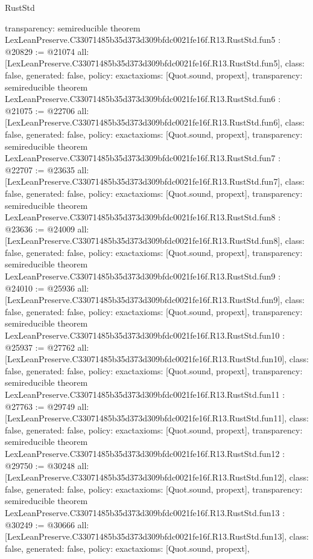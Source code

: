 \begin{lexlean}{RustStd}
\begin{coremodule}
{  transparency: semireducible
}
theorem LexLeanPreserve.C33071485b35d373d309bfdc0021fe16f.R13.RustStd.fun5 : @20829 := @21074 {
  all: [LexLeanPreserve.C33071485b35d373d309bfdc0021fe16f.R13.RustStd.fun5],
  class: false,
  generated: false,
  policy: exact{axioms: [Quot.sound, propext]},
  transparency: semireducible
}
theorem LexLeanPreserve.C33071485b35d373d309bfdc0021fe16f.R13.RustStd.fun6 : @21075 := @22706 {
  all: [LexLeanPreserve.C33071485b35d373d309bfdc0021fe16f.R13.RustStd.fun6],
  class: false,
  generated: false,
  policy: exact{axioms: [Quot.sound, propext]},
  transparency: semireducible
}
theorem LexLeanPreserve.C33071485b35d373d309bfdc0021fe16f.R13.RustStd.fun7 : @22707 := @23635 {
  all: [LexLeanPreserve.C33071485b35d373d309bfdc0021fe16f.R13.RustStd.fun7],
  class: false,
  generated: false,
  policy: exact{axioms: [Quot.sound, propext]},
  transparency: semireducible
}
theorem LexLeanPreserve.C33071485b35d373d309bfdc0021fe16f.R13.RustStd.fun8 : @23636 := @24009 {
  all: [LexLeanPreserve.C33071485b35d373d309bfdc0021fe16f.R13.RustStd.fun8],
  class: false,
  generated: false,
  policy: exact{axioms: [Quot.sound, propext]},
  transparency: semireducible
}
theorem LexLeanPreserve.C33071485b35d373d309bfdc0021fe16f.R13.RustStd.fun9 : @24010 := @25936 {
  all: [LexLeanPreserve.C33071485b35d373d309bfdc0021fe16f.R13.RustStd.fun9],
  class: false,
  generated: false,
  policy: exact{axioms: [Quot.sound, propext]},
  transparency: semireducible
}
theorem LexLeanPreserve.C33071485b35d373d309bfdc0021fe16f.R13.RustStd.fun10 : @25937 := @27762 {
  all: [LexLeanPreserve.C33071485b35d373d309bfdc0021fe16f.R13.RustStd.fun10],
  class: false,
  generated: false,
  policy: exact{axioms: [Quot.sound, propext]},
  transparency: semireducible
}
theorem LexLeanPreserve.C33071485b35d373d309bfdc0021fe16f.R13.RustStd.fun11 : @27763 := @29749 {
  all: [LexLeanPreserve.C33071485b35d373d309bfdc0021fe16f.R13.RustStd.fun11],
  class: false,
  generated: false,
  policy: exact{axioms: [Quot.sound, propext]},
  transparency: semireducible
}
theorem LexLeanPreserve.C33071485b35d373d309bfdc0021fe16f.R13.RustStd.fun12 : @29750 := @30248 {
  all: [LexLeanPreserve.C33071485b35d373d309bfdc0021fe16f.R13.RustStd.fun12],
  class: false,
  generated: false,
  policy: exact{axioms: [Quot.sound, propext]},
  transparency: semireducible
}
theorem LexLeanPreserve.C33071485b35d373d309bfdc0021fe16f.R13.RustStd.fun13 : @30249 := @30666 {
  all: [LexLeanPreserve.C33071485b35d373d309bfdc0021fe16f.R13.RustStd.fun13],
  class: false,
  generated: false,
  policy: exact{axioms: [Quot.sound, propext]},
}
\end{coremodule}
\end{lexlean}
